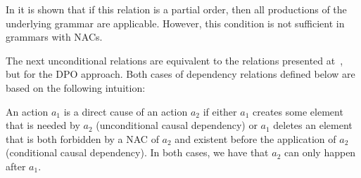 \begin{example}
\end{example}

In \cite{Corradini1996} it is shown that if this relation is a partial order, then all productions of the underlying grammar are applicable. However, this condition is not sufficient in grammars with NACs.

\begin{example}
\end{example}

The next unconditional relations are equivalent to the relations presented at~\cite{Ribeiro1996}, but for the DPO approach. Both cases of dependency relations defined below are based on the following intuition:

\begin{intuition} An action $a_1$ is a direct cause of an action $a_2$ if either $a_1$ creates some element that is needed by $a_2$ (unconditional causal dependency) or $a_1$ deletes an element that is both forbidden by a NAC of $a_2$ and existent before the application of $a_2$ (conditional causal dependency). In both cases, we have that $a_2$ can only happen after $a_1$. 
\end{intuition}

